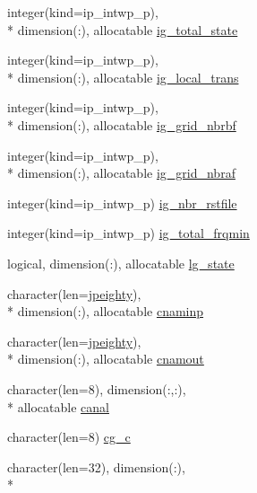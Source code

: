\begin{DoxyCompactItemize}
\item 
integer(kind=ip\+\_\+intwp\+\_\+p), \\*
dimension(\+:), allocatable \hyperlink{classmod__oasis__namcouple_a7c783457d0e759e3af98b92146fa4ec3}{ig\+\_\+total\+\_\+state}
\item 
integer(kind=ip\+\_\+intwp\+\_\+p), \\*
dimension(\+:), allocatable \hyperlink{classmod__oasis__namcouple_a510a13e57f2f65d5ddc70c729d54c0f6}{ig\+\_\+local\+\_\+trans}
\item 
integer(kind=ip\+\_\+intwp\+\_\+p), \\*
dimension(\+:), allocatable \hyperlink{classmod__oasis__namcouple_ae81f2e658bbaeae20badef0fad425a69}{ig\+\_\+grid\+\_\+nbrbf}
\item 
integer(kind=ip\+\_\+intwp\+\_\+p), \\*
dimension(\+:), allocatable \hyperlink{classmod__oasis__namcouple_a8e8c38746c6c35b13d2d9b934835188c}{ig\+\_\+grid\+\_\+nbraf}
\item 
integer(kind=ip\+\_\+intwp\+\_\+p) \hyperlink{classmod__oasis__namcouple_a05148b30ca97c536b40a896153c8921f}{ig\+\_\+nbr\+\_\+rstfile}
\item 
integer(kind=ip\+\_\+intwp\+\_\+p) \hyperlink{classmod__oasis__namcouple_a839912711f8d2f44a825689e2673d0dd}{ig\+\_\+total\+\_\+frqmin}
\item 
logical, dimension(\+:), allocatable \hyperlink{classmod__oasis__namcouple_ac1be1629c1369b96a4ff08c07200a05d}{lg\+\_\+state}
\item 
character(len=\hyperlink{classmod__oasis__namcouple_a4fb10ad6e864dcbe34c4a8b02204a523}{jpeighty}), \\*
dimension(\+:), allocatable \hyperlink{classmod__oasis__namcouple_a1f6ff08cee0c3c5deb262c1447d88328}{cnaminp}
\item 
character(len=\hyperlink{classmod__oasis__namcouple_a4fb10ad6e864dcbe34c4a8b02204a523}{jpeighty}), \\*
dimension(\+:), allocatable \hyperlink{classmod__oasis__namcouple_a71ba84b9a7a813ca2551bcde99a0b5b5}{cnamout}
\item 
character(len=8), dimension(\+:,\+:), \\*
allocatable \hyperlink{classmod__oasis__namcouple_a5eaa67fd4db1a3cde074adedd984ffbe}{canal}
\item 
character(len=8) \hyperlink{classmod__oasis__namcouple_a8a7387f27c409ea27aa53b616805f0fa}{cg\+\_\+c}
\item 
character(len=32), dimension(\+:), \\*

\end{DoxyCompactItemize}
